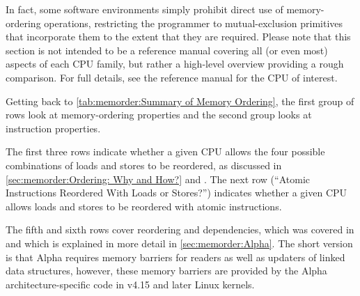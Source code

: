\begin{table}[tb]
\vspace{5pt}\hfill
{}\OneColumnHSpace{-0.4in}
\caption{Summary of Memory Ordering}
\label{tab:memorder:Summary of Memory Ordering}
\end{table}

In fact, some software environments simply prohibit
direct use of memory-ordering operations, restricting the programmer
to mutual-exclusion primitives that incorporate them to the extent that
they are required.
Please note that this section is not intended to be a reference manual
covering all (or even most) aspects of each CPU family, but rather
a high-level overview providing a rough comparison.
For full details, see the reference manual for the CPU of interest.

Getting back to
\cref{tab:memorder:Summary of Memory Ordering},
the first group of rows look at memory-ordering
properties and the second group looks at instruction properties.

The first three rows indicate whether a given CPU allows the four
possible combinations of loads and stores to be reordered, as discussed
in
\cref{sec:memorder:Ordering: Why and How?} and
.
The next row (``Atomic Instructions Reordered With Loads or Stores?\@'')
indicates whether a given CPU allows loads and stores
to be reordered with atomic instructions.

The fifth and sixth rows cover reordering and dependencies,
which was covered in
and which is explained in more detail in
\cref{sec:memorder:Alpha}.
The short version is that Alpha requires memory barriers for readers
as well as updaters of linked data structures, however, these memory
barriers are provided by the Alpha architecture-specific code in
v4.15 and later Linux kernels.

